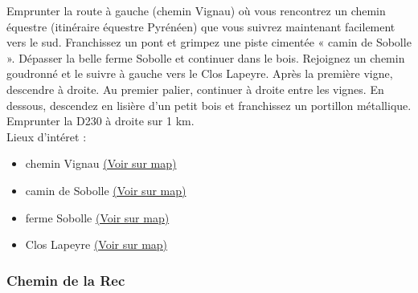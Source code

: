\documentclass[titlepage]{article}
\begin{document}
                        Emprunter la route à gauche (chemin Vignau) où vous rencontrez un chemin équestre (itinéraire équestre Pyrénéen) que vous suivrez maintenant facilement vers le sud. Franchissez un pont et grimpez une piste cimentée « camin de Sobolle ». Dépasser la belle ferme Sobolle et continuer dans le bois. Rejoignez un chemin goudronné et le suivre à gauche vers le Clos Lapeyre. Après la première vigne, descendre à droite. Au premier palier, continuer à droite entre les vignes. En dessous, descendez en lisière d'un petit bois et franchissez un portillon métallique. Emprunter la D230 à droite sur 1 km.
                    \\
        Lieux d'intéret : 
        \begin{itemize}
        
        \item {
        chemin
                            Vignau 
        \href{https://www.google.com/maps/?q=43.287530, -0.391115}{(Voir sur map)}
        }
    
        \item {
         camin de
                            Sobolle 
        \href{https://www.google.com/maps/?q=43.287530, -0.391115}{(Voir sur map)}
        }
    
        \item {
        ferme Sobolle 
        \href{https://www.google.com/maps/?q=43.287530, -0.391115}{(Voir sur map)}
        }
    
        \item {
        Clos Lapeyre 
        \href{https://www.google.com/maps/?q=43.287530, -0.391115}{(Voir sur map)}
        }
    
        \end{itemize}
    
        
        \subsubsection{Chemin de la Rec}
        \paragraph{}
        
\end{document}
